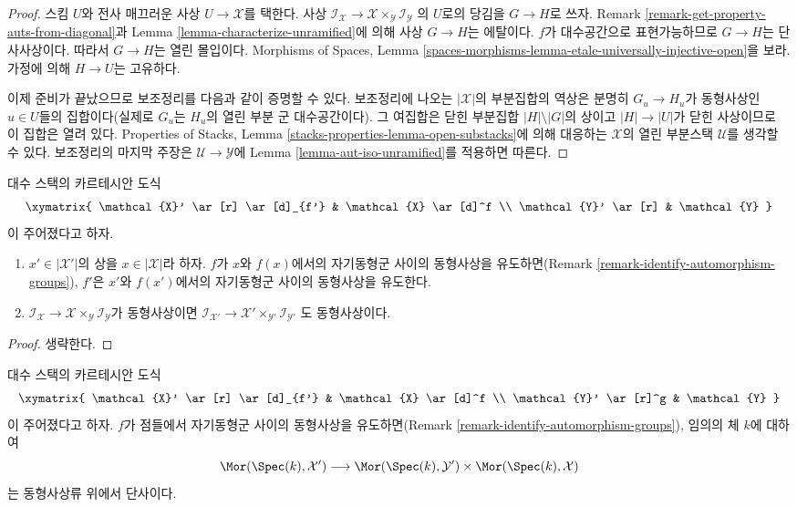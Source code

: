 \begin{proof}
스킴 $U$와 전사 매끄러운 사상 $U \to \mathcal{X}$를 택한다. 사상
$\mathcal{I}_\mathcal{X} \to
\mathcal{X} \times_\mathcal{Y} \mathcal{I}_\mathcal{Y}$
의 $U$로의 당김을 $G \to H$로 쓰자. Remark
\ref{remark-get-property-auts-from-diagonal}과 Lemma
\ref{lemma-characterize-unramified}에 의해 사상 $G \to H$는 에탈이다.
$f$가 대수공간으로 표현가능하므로 $G \to H$는 단사사상이다. 따라서
$G \to H$는 열린 몰입이다. Morphisms of Spaces, Lemma
\ref{spaces-morphisms-lemma-etale-universally-injective-open}을 보라. 가정에
의해 $H \to U$는 고유하다.

\medskip\noindent
이제 준비가 끝났으므로 보조정리를 다음과 같이 증명할 수 있다. 보조정리에
나오는 $|\mathcal{X}|$의 부분집합의 역상은 분명히
$G_u \to H_u$가 동형사상인 $u \in U$들의 집합이다(실제로 $G_u$는
$H_u$의 열린 부분 군 대수공간이다). 그 여집합은 닫힌 부분집합
$|H| \setminus |G|$의 상이고 $|H| \to |U|$가 닫힌 사상이므로 이
집합은 열려 있다. Properties of Stacks, Lemma
\ref{stacks-properties-lemma-open-substacks}에 의해 대응하는
$\mathcal{X}$의 열린 부분스택 $\mathcal{U}$를 생각할 수 있다. 보조정리의
마지막 주장은 $\mathcal{U} \to \mathcal{Y}$에 Lemma
\ref{lemma-aut-iso-unramified}를 적용하면 따른다.
\end{proof}

\begin{lemma}
\label{lemma-base-change-stabilizer-preserving}
대수 스택의 카르테시안 도식
$$
\xymatrix{
\mathcal{X}' \ar[r] \ar[d]_{f'} & \mathcal{X} \ar[d]^f \\
\mathcal{Y}' \ar[r] & \mathcal{Y}
}
$$
이 주어졌다고 하자.
\begin{enumerate}
\item $x' \in |\mathcal{X}'|$의 상을 $x \in |\mathcal{X}|$라 하자.
$f$가 $x$와 $f(x)$에서의 자기동형군 사이의 동형사상을 유도하면(Remark
\ref{remark-identify-automorphism-groups}), $f'$은 $x'$와
$f(x')$에서의 자기동형군 사이의 동형사상을 유도한다.
\item $\mathcal{I}_\mathcal{X} \to
\mathcal{X} \times_\mathcal{Y} \mathcal{I}_\mathcal{Y}$가 동형사상이면
$\mathcal{I}_{\mathcal{X}'} \to
\mathcal{X}' \times_{\mathcal{Y}'} \mathcal{I}_{\mathcal{Y}'}$
도 동형사상이다.
\end{enumerate}
\end{lemma}

\begin{proof}
생략한다.
\end{proof}

\begin{lemma}
\label{lemma-stabilizer-preserving-points-cartesian}
대수 스택의 카르테시안 도식
$$
\xymatrix{
\mathcal{X}' \ar[r] \ar[d]_{f'} & \mathcal{X} \ar[d]^f \\
\mathcal{Y}' \ar[r]^g & \mathcal{Y}
}
$$
이 주어졌다고 하자. $f$가 점들에서 자기동형군 사이의 동형사상을
유도하면(Remark \ref{remark-identify-automorphism-groups}), 임의의 체
$k$에 대하여
$$
\Mor(\Spec(k), \mathcal{X}')
\longrightarrow
\Mor(\Spec(k), \mathcal{Y}') \times \Mor(\Spec(k), \mathcal{X})
$$
는 동형사상류 위에서 단사이다.
\end{lemma}

